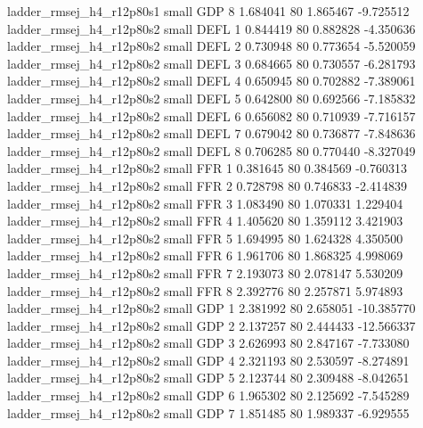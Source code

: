 ladder_rmsej_h4_r12p80s1      small      GDP                 8 1.684041 80       1.865467          -9.725512
ladder_rmsej_h4_r12p80s2      small     DEFL                 1 0.844419 80       0.882828          -4.350636
ladder_rmsej_h4_r12p80s2      small     DEFL                 2 0.730948 80       0.773654          -5.520059
ladder_rmsej_h4_r12p80s2      small     DEFL                 3 0.684665 80       0.730557          -6.281793
ladder_rmsej_h4_r12p80s2      small     DEFL                 4 0.650945 80       0.702882          -7.389061
ladder_rmsej_h4_r12p80s2      small     DEFL                 5 0.642800 80       0.692566          -7.185832
ladder_rmsej_h4_r12p80s2      small     DEFL                 6 0.656082 80       0.710939          -7.716157
ladder_rmsej_h4_r12p80s2      small     DEFL                 7 0.679042 80       0.736877          -7.848636
ladder_rmsej_h4_r12p80s2      small     DEFL                 8 0.706285 80       0.770440          -8.327049
ladder_rmsej_h4_r12p80s2      small      FFR                 1 0.381645 80       0.384569          -0.760313
ladder_rmsej_h4_r12p80s2      small      FFR                 2 0.728798 80       0.746833          -2.414839
ladder_rmsej_h4_r12p80s2      small      FFR                 3 1.083490 80       1.070331           1.229404
ladder_rmsej_h4_r12p80s2      small      FFR                 4 1.405620 80       1.359112           3.421903
ladder_rmsej_h4_r12p80s2      small      FFR                 5 1.694995 80       1.624328           4.350500
ladder_rmsej_h4_r12p80s2      small      FFR                 6 1.961706 80       1.868325           4.998069
ladder_rmsej_h4_r12p80s2      small      FFR                 7 2.193073 80       2.078147           5.530209
ladder_rmsej_h4_r12p80s2      small      FFR                 8 2.392776 80       2.257871           5.974893
ladder_rmsej_h4_r12p80s2      small      GDP                 1 2.381992 80       2.658051         -10.385770
ladder_rmsej_h4_r12p80s2      small      GDP                 2 2.137257 80       2.444433         -12.566337
ladder_rmsej_h4_r12p80s2      small      GDP                 3 2.626993 80       2.847167          -7.733080
ladder_rmsej_h4_r12p80s2      small      GDP                 4 2.321193 80       2.530597          -8.274891
ladder_rmsej_h4_r12p80s2      small      GDP                 5 2.123744 80       2.309488          -8.042651
ladder_rmsej_h4_r12p80s2      small      GDP                 6 1.965302 80       2.125692          -7.545289
ladder_rmsej_h4_r12p80s2      small      GDP                 7 1.851485 80       1.989337          -6.929555
